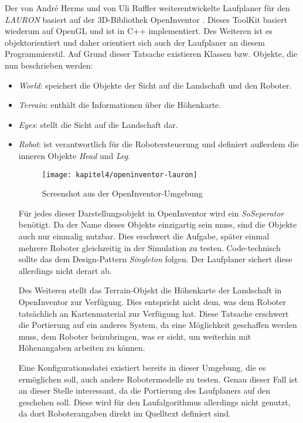 Der von André Herms \autocite{herms2004} und von Uli Ruffler \autocite{ruffler2006} weiterentwickelte Laufplaner für den \emph{LAURON} basiert auf der 3D-Bibliothek OpenInventor \autocite{inventor}. Dieses ToolKit basiert wiederum auf OpenGL und ist in C++ implementiert. Des Weiteren ist es objektorientiert und daher orientiert sich auch der Laufplaner an diesem Programmierstil. Auf Grund dieser Tatsache existieren Klassen bzw. Objekte, die nun beschrieben werden:
\begin{itemize}
  \item \emph{World}: speichert die Objekte der Sicht auf die Landschaft und den Roboter. 
  \item \emph{Terrain}: enthält die Informationen über die Höhenkarte.
  \item \emph{Eyes}: stellt die Sicht auf die Landschaft dar.
  \item \emph{Robot}: ist verantwortlich für die Robotersteuerung und definiert außerdem die inneren Objekte \emph{Head} und \emph{Leg}.
  
\begin{figure}[t!]
  \centering
  \texttt{[image: kapitel4/openinventor-lauron]}
  \caption{Screenshot aus der OpenInventor-Umgebung}
  \label{Kap4:OpenInventorLauron}
\end{figure}

Für jedes dieser Darstellungsobjekt in OpenInventor wird ein \emph{SoSeperator} benötigt. Da der Name dieses Objekts einzigartig sein muss, sind die Objekte auch nur einmalig nutzbar. Dies erschwert die Aufgabe, später einmal mehrere Roboter gleichzeitig in der Simulation zu testen. Code-technisch sollte das dem Design-Pattern \emph{Singleton} folgen. Der Laufplaner sichert diese allerdings nicht derart ab.

Des Weiteren stellt das Terrain-Objekt die Höhenkarte der Landschaft in OpenInventor zur Verfügung. Dies entspricht nicht dem, was dem Roboter tatsächlich an Kartenmaterial zur Verfügung hat. Diese Tatsache erschwert die Portierung auf ein anderes System, da eine Möglichkeit geschaffen werden muss, dem Roboter beizubringen, was er sieht, um weiterhin mit Höhenangaben arbeiten zu können.

Eine Konfigurationsdatei existiert bereits in dieser Umgebung, die es ermöglichen soll, auch andere Robotermodelle zu testen. Genau dieser Fall ist an dieser Stelle interessant, da die Portierung des Laufplaners auf den  geschehen soll. Diese wird für den Laufalgorithmus allerdings nicht genutzt, da dort Roboterangaben direkt im Quelltext definiert sind.


\end{itemize}
